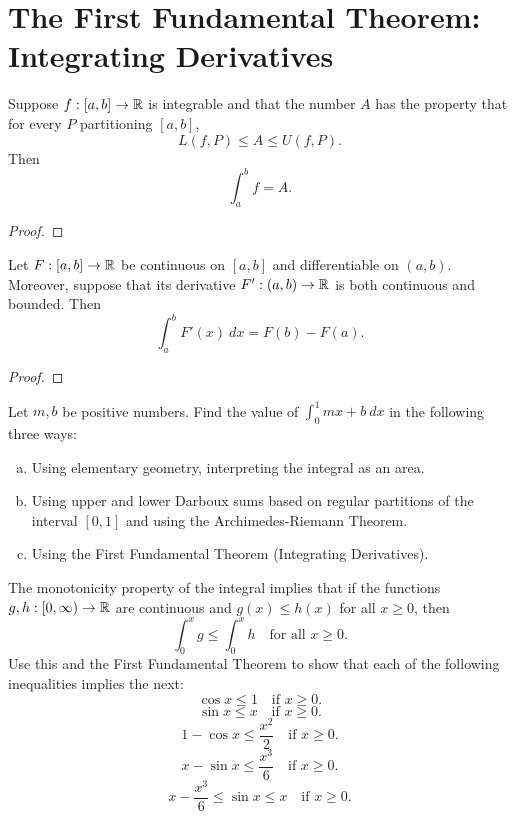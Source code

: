 \documentclass[letterpaper, twoside, 12pt]{book}
\begin{document}
\section{The First Fundamental Theorem: Integrating Derivatives}


\begin{lemma}[6.21]
  Suppose \(f:[a,b]\to\mathbb R\) is integrable and that the number \(A\) has
  the property that for every \(P\) partitioning \([a,b]\),
  \[
    L(f,P) \leq A \leq U(f,P)
  .\]
  Then
  \[
    \int_a^b f = A
  .\]
\end{lemma}
\begin{proof}

\end{proof}


\begin{theorem}
  Let \(F:[a,b]\to\mathbb R\) be continuous on \([a,b]\) and differentiable on
  \((a,b)\). Moreover, suppose that its derivative
  \(F':(a,b)\to\mathbb R\) is both continuous and bounded. Then
  \[
    \int_a^b F'(x)~dx
      =
    F(b)-F(a)
  .\]
\end{theorem}
\begin{proof}

\end{proof}


\begin{exercise}[1]
  Let \(m,b\) be positive numbers. Find the value of \(\int_0^1 mx+b ~dx\)
  in the following three ways:
  \begin{enumerate}[(a)]
    \item Using elementary geometry, interpreting the integral as an area.
    \item Using upper and lower Darboux sums based on regular partitions of
      the interval \([0,1]\) and using the Archimedes-Riemann Theorem.
    \item Using the First Fundamental Theorem (Integrating Derivatives).
  \end{enumerate}
\end{exercise}
\begin{solution}

\end{solution}


\begin{exercise}[5]
  The monotonicity property of the integral implies that if the functions
  \(g,h:[0,\infty)\to\mathbb R\) are continuous and \(g(x)\leq h(x)\) for all
  \(x\geq 0\), then
  \[
    \int_0^x g\leq \int_0^x h
    \text{~~ for all~} x\geq 0
  .\]
  Use this and the First Fundamental Theorem to show that each of the following
  inequalities implies the next:
  \[
    \cos x \leq 1
    \text{~~ if~} x\geq 0
  .\]
  \[
    \sin x \leq x
    \text{~~ if~} x\geq 0
  .\]
  \[
    1-\cos x \leq \frac{x^2}{2}
    \text{~~ if~} x\geq 0
  .\]
  \[
    x-\sin x \leq \frac{x^3}{6}
    \text{~~ if~} x\geq 0
  .\]
  \[
    x-\frac{x^3}{6} \leq \sin x \leq x
    \text{~~ if~} x\geq 0
  .\]
\end{exercise}
\end{document}
